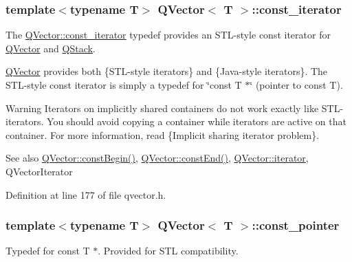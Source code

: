 \subsubsection[{\texorpdfstring{const\+\_\+iterator}{const_iterator}}]{\setlength{\rightskip}{0pt plus 5cm}template$<$typename T$>$ {\bf Q\+Vector}$<$ T $>$\+::{\bf const\+\_\+iterator}}\hypertarget{class_q_vector_a01e19bfad7fefd3e97ef197f4ed2cceb}{}\label{class_q_vector_a01e19bfad7fefd3e97ef197f4ed2cceb}
The \hyperlink{class_q_vector_a01e19bfad7fefd3e97ef197f4ed2cceb}{Q\+Vector\+::const\+\_\+iterator} typedef provides an S\+T\+L-\/style const iterator for \hyperlink{class_q_vector}{Q\+Vector} and \hyperlink{class_q_stack}{Q\+Stack}.

\hyperlink{class_q_vector}{Q\+Vector} provides both \{S\+T\+L-\/style iterators\} and \{Java-\/style iterators\}. The S\+T\+L-\/style const iterator is simply a typedef for \char`\"{}const T $\ast$\char`\"{} (pointer to const T).

\begin{DoxyWarning}{Warning}
Iterators on implicitly shared containers do not work exactly like S\+T\+L-\/iterators. You should avoid copying a container while iterators are active on that container. For more information, read \{Implicit sharing iterator problem\}.
\end{DoxyWarning}
\begin{DoxySeeAlso}{See also}
\hyperlink{class_q_vector_a8f2ae9da9b4f929a1cbb718e2ff1a9ca}{Q\+Vector\+::const\+Begin()}, \hyperlink{class_q_vector_a86b54d84b2435c97d8ec62d5149eeee8}{Q\+Vector\+::const\+End()}, \hyperlink{class_q_vector_af6ac26e0dfede6e3045be0c947201267}{Q\+Vector\+::iterator}, Q\+Vector\+Iterator 
\end{DoxySeeAlso}


Definition at line 177 of file qvector.\+h.

\subsubsection[{\texorpdfstring{const\+\_\+pointer}{const_pointer}}]{\setlength{\rightskip}{0pt plus 5cm}template$<$typename T$>$ {\bf Q\+Vector}$<$ T $>$\+::{\bf const\+\_\+pointer}}\hypertarget{class_q_vector_aa5e3dc32b0a887d59bf5c5c30c95eb85}{}\label{class_q_vector_aa5e3dc32b0a887d59bf5c5c30c95eb85}
Typedef for const T $\ast$. Provided for S\+TL compatibility. 

